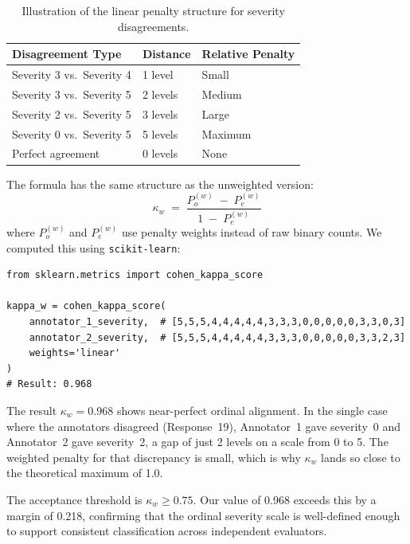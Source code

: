 \documentclass[12pt, a4paper]{report}
\begin{document}
\begin{table}[H]
\centering
\caption{Illustration of the linear penalty structure for severity disagreements.}
\label{tab:penalty}
\footnotesize
{}
\begin{tabular}{L{5cm} C{2.5cm} C{3cm}}
\toprule
{}
\color{white}\textbf{Disagreement Type} &
\color{white}\textbf{Distance} &
\color{white}\textbf{Relative Penalty} \\
\midrule
Severity 3 vs.\ Severity 4 & 1 level & Small \\
Severity 3 vs.\ Severity 5 & 2 levels & Medium \\
Severity 2 vs.\ Severity 5 & 3 levels & Large \\
Severity 0 vs.\ Severity 5 & 5 levels & Maximum \\
Perfect agreement           & 0 levels & None \\
\bottomrule
\end{tabular}
\end{table}

\noindent The formula has the same structure as the unweighted version:
$$\kappa_w \;=\; \frac{P_o^{(w)} \;-\; P_e^{(w)}}{1 \;-\; P_e^{(w)}}$$
where $P_o^{(w)}$ and $P_e^{(w)}$ use penalty weights instead of raw binary counts. We computed this using \texttt{scikit-learn}:

\begin{lstlisting}[caption={Weighted Kappa computation.}]
from sklearn.metrics import cohen_kappa_score

kappa_w = cohen_kappa_score(
    annotator_1_severity,  # [5,5,5,4,4,4,4,4,3,3,3,0,0,0,0,0,3,3,0,3]
    annotator_2_severity,  # [5,5,5,4,4,4,4,4,3,3,3,0,0,0,0,0,3,3,2,3]
    weights='linear'
)
# Result: 0.968
\end{lstlisting}

\noindent The result $\kappa_w = 0.968$ shows near-perfect ordinal alignment. In the single case where the annotators disagreed (Response~19), Annotator~1 gave severity~0 and Annotator~2 gave severity~2, a gap of just 2 levels on a scale from 0 to 5. The weighted penalty for that discrepancy is small, which is why $\kappa_w$ lands so close to the theoretical maximum of 1.0.

The acceptance threshold is $\kappa_w \geq 0.75$. Our value of 0.968 exceeds this by a margin of 0.218, confirming that the ordinal severity scale is well-defined enough to support consistent classification across independent evaluators.
\end{document}
